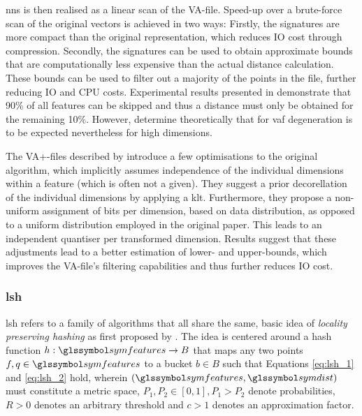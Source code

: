 \acrshort{nns} is then realised as a linear scan of the VA-file. Speed-up over a brute-force scan of the original vectors is achieved in two ways: Firstly, the signatures are more compact than the original representation, which reduces IO cost through compression. Secondly, the signatures can be used to obtain approximate bounds that are computationally less expensive than the actual distance calculation. These bounds can be used to filter out a majority of the points in the file, further reducing IO and CPU costs. Experimental results presented in \cite{Weber:1998Va} demonstrate that 90\% of all features can be skipped and thus a distance must only be obtained for the remaining 10\%. However, \cite{Echihabi:2021High} determine theoretically that for \acrshort{vaf} degeneration is to be expected nevertheless for high dimensions.

The VA+-files described by \cite{Ferhatosmanoglu:2000Vector} introduce a few optimisations to the original algorithm, which implicitly assumes independence of the individual dimensions within a feature (which is often not a given). They suggest a prior decorellation of the individual dimensions by applying a \acrfull{klt}. Furthermore, they propose a non-uniform assignment of bits per dimension, based on data distribution, as opposed to a uniform distribution employed in the original paper. This leads to an independent quantiser per transformed dimension. Results suggest that these adjustments lead to a better estimation of lower- and upper-bounds, which improves the VA-file's filtering capabilities and thus further reduces IO cost.

\subsubsection{\texorpdfstring{\acrfull{lsh}}{Locality Sensitive Hashing (LSH)}}

\acrshort{lsh} refers to a family of algorithms \cite{Echihabi:2021High,Wang:2017ASurvey} that all share the same, basic idea of \emph{locality preserving hashing} as first proposed by \cite{Indyk1998:Approximate}. The idea is centered around a hash function $h: \symfeatures \rightarrow B$ that maps any two points $f,q \in \symfeatures$ to a bucket $b \in B$ such that Equations \ref{eq:lsh_1} and \ref{eq:lsh_2} hold, wherein $(\symfeatures, \symdist)$ must constitute a metric space, $P_1, P_2 \in [0, 1], P_1 > P_2$ denote probabilities, $R > 0$ denotes an arbitrary threshold and $c > 1$ denotes an approximation factor.


